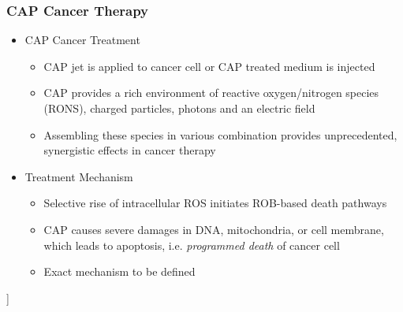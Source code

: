 \documentclass[hyperref={pdftex,pdfpagemode=none,pdfstartview=Fit}]{beamer}
\begin{document}
\begin{frame}
    \frametitle{CAP Cancer Therapy}

    \begin{itemize}
        \item CAP Cancer Treatment 
            \begin{itemize}
                \item CAP jet is applied to cancer cell or CAP treated medium is injected
                \item CAP provides a rich environment of reactive oxygen/nitrogen species (RONS), charged particles, photons and an electric field
                \item Assembling these species in various combination provides unprecedented, synergistic effects in cancer therapy
            \end{itemize}
            \vspace*{0.3cm}
        \item Treatment Mechanism
            \begin{itemize}
                \item Selective rise of intracellular ROS initiates ROB-based death pathways
                \item CAP causes severe damages in DNA, mitochondria, or cell membrane, which leads to apoptosis, i.e. \textit{programmed  death} of cancer cell
                \item Exact mechanism to be defined
            \end{itemize}
    \end{itemize}]
\end{frame}
\end{document}
